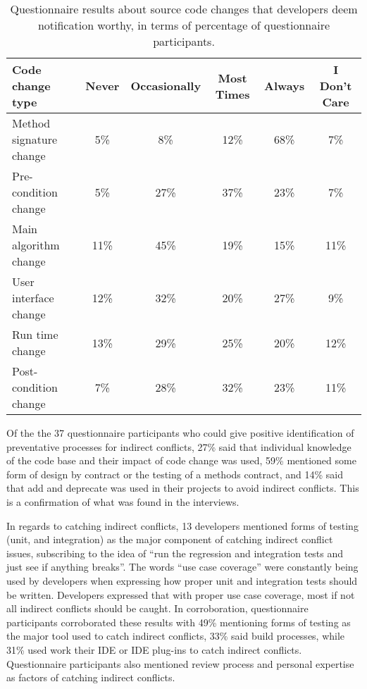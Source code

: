 \documentclass[conference]{IEEEtran}
\begin{document}
\begin{table*}[tb!]
\begin{center}
\begin{tabular}{| p{7cm} | c | c | c | c | c |}
\hline
Code change type &Never  & Occasionally & Most Times & Always & I Don't Care \\
\hline
\hline
Method signature change & 5\% & 8\% & 12\% & 68\% & 7\% \\ \hline
Pre-condition change & 5\% & 27\% & 37\% & 23\% & 7\% \\ \hline
Main algorithm change & 11\% & 45\% & 19\% & 15\% & 11\% \\ \hline
User interface change & 12\% & 32\% & 20\% & 27\% & 9\% \\ \hline
Run time change & 13\% & 29\% & 25\% & 20\% & 12\% \\ \hline
Post-condition change & 7\% & 28\% & 32\% & 23\% & 11\% \\ \hline
\end{tabular}
\end{center}
\caption{Questionnaire results about source code changes that developers deem notification worthy, in terms of percentage
of questionnaire participants.\label{tab:pre}}
\end{table*}

Of the the 37 questionnaire participants who could give positive identification of preventative processes for indirect conflicts,
27\% said that individual knowledge of the code base and their impact of code change was used, 59\% mentioned some form of design
by contract or the testing of a methods contract, and 14\% said that add and
deprecate was used in their projects to avoid indirect conflicts. This is a confirmation of what was found in the interviews.

In regards to catching indirect conflicts, 13 developers mentioned forms of testing (unit, and integration)
as the major component of catching indirect conflict issues, subscribing to the idea of ``run the regression and integration
tests and just see if anything breaks''. The words ``use case coverage'' were constantly being used by developers
when expressing how proper unit and integration tests should be written. Developers expressed that with proper use case coverage, most if
not all indirect conflicts should be caught. In corroboration,
questionnaire participants corroborated these results with 49\% mentioning forms of testing as the major tool used to
catch indirect conflicts, 33\% said build processes, while 31\% used work their IDE or IDE plug-ins to catch indirect conflicts.
Questionnaire participants also mentioned review process and personal expertise as factors of catching indirect conflicts.
\end{document}
